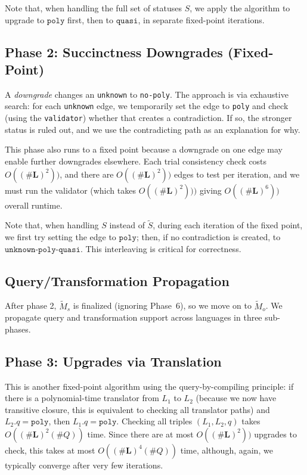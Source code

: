 \documentclass[10pt]{article}
\theoremstyle{plain}
\theoremstyle{definition}
\theoremstyle{remark}
\begin{document}
Note that, when handling the full set of statuses $S$, we apply the algorithm to upgrade to $\texttt{poly}$ first, then to $\texttt{quasi}$, in separate fixed-point iterations.

\subsection{Phase 2: Succinctness Downgrades (Fixed-Point)}

A \emph{downgrade} changes an \texttt{unknown} to \texttt{no-poly}. The approach is via exhaustive search: for each \texttt{unknown} edge, we temporarily set the edge to \texttt{poly} and check (using the \texttt{validator}) whether that creates a contradiction. If so, the stronger status is ruled out, and we use the contradicting path as an explanation for why.

This phase also runs to a fixed point because a downgrade on one edge may enable further downgrades elsewhere. Each trial consistency check costs $O((\#\textbf{L})^2))$, and there are $O((\#\textbf{L})^2))$ edges to test per iteration, and we must run the validator (which takes $O((\#\textbf{L})^2)))$ giving $O((\#\textbf{L})^6))$ overall runtime.

Note that, when handling $S$ instead of $\tilde S$, during each iteration of the fixed point, we first try setting the edge to $\texttt{poly}$; then, if no contradiction is created, to $\texttt{unknown-poly-quasi}$. This interleaving is critical for correctness.

\subsection{Query/Transformation Propagation}

After phase 2, $\widetilde M_s$ is finalized (ignoring Phase~6), so we move on to $\widetilde M_o$. We propagate query and transformation support across languages in three sub-phases.

\subsection{Phase 3: Upgrades via Translation}

This is another fixed-point algorithm using the query-by-compiling principle: if there is a polynomial-time translator from $L_1$ to $L_2$ (because we now have transitive closure, this is equivalent to checking all translator paths) and $L_2.q = \texttt{poly}$, then $L_1.q = \texttt{poly}$. Checking all triples $(L_1, L_2, q)$ takes $O((\#\textbf{L})^2(\#Q))$ time. Since there are at most $O((\#\textbf{L})^2))$ upgrades to check, this takes at most $O((\#\textbf{L})^4(\#Q))$ time, although, again, we typically converge after very few iterations.
\end{document}
